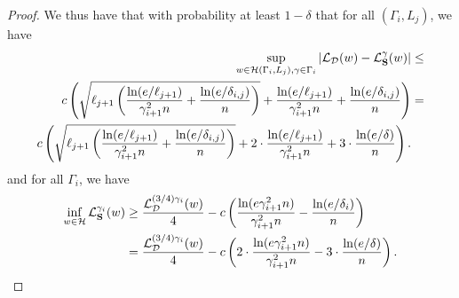 \begin{proof}
We thus have that with probability at least $1-\delta$ that for all $(\Gamma_i, L_j)$, we have
\begin{align*}
\sup_{w \in \mathcal{H}(\Gamma_i, L_j), \gamma \in \Gamma_i} \left|\mathcal{L}_{\mathcal{D}}(w) - \mathcal{L}^{\gamma}_{\mathbf{S}}(w) \right| &\leq \nonumber\\
c \left(\sqrt{\ell_{j+1}\left( \frac{ \ln(e/\ell_{j+1})}{\gamma_{i+1}^2 n} + \frac{\ln(e/\delta_{i,j})}{n} \right)} + \frac{\ln(e/\ell_{j+1})}{\gamma_{i+1}^2 n} + \frac{\ln(e/\delta_{i,j})}{n} \right) &=\\
c \left(\sqrt{\ell_{j+1}\left( \frac{ \ln(e/\ell_{j+1})}{\gamma_{i+1}^2 n} + \frac{\ln(e/\delta_{i,j})}{n} \right)} + 2\cdot \frac{\ln(e/\ell_{j+1})}{\gamma_{i+1}^2 n} + 3 \cdot \frac{\ln(e/\delta)}{n} \right).
\end{align*}
and for all $\Gamma_i$, we have
\begin{align*}
\inf_{w \in \mathcal{H}} \mathcal{L}_{\mathbf{S}}^{\gamma_i}(w) &\geq \frac{\mathcal{L}_{ \mathcal{D}}^{(3/4)\gamma_i}(w)}{4} - c \left(\frac{\ln(e\gamma_{i+1}^2 n)}{\gamma_{i+1}^2 n} - \frac{\ln(e/\delta_i)}{n}\right)\\ &=
\frac{\mathcal{L}_{ \mathcal{D}}^{(3/4)\gamma_i}(w)}{4} - c \left(2 \cdot \frac{\ln(e\gamma_{i+1}^2 n)}{\gamma_{i+1}^2 n} - 3 \cdot \frac{\ln(e/\delta)}{n}\right).
\end{align*}
\end{proof}

